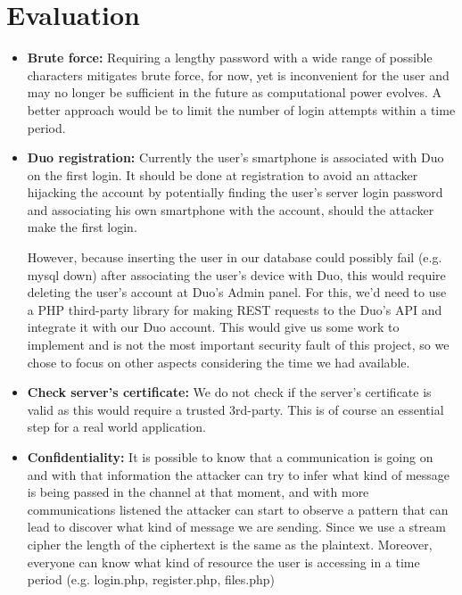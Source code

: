 \documentclass[12pt]{article}
\begin{document}
\section{Evaluation}
\begin{itemize}
    \item\textbf{Brute force:}
    Requiring a lengthy password with a wide range of possible characters mitigates brute force, for now, yet is inconvenient for the user and may no longer be sufficient in the future as computational power evolves. A better approach would be to limit the number of login attempts within a time period.

    \item \textbf{Duo registration:}
    Currently the user's smartphone is associated with Duo on the first login. It should be done at registration to avoid an attacker hijacking the account by potentially finding the user's server login password and associating his own smartphone with the account, should the attacker make the first login.

    However, because inserting the user in our database could possibly fail (e.g. mysql down) after associating the user's device with Duo, this would require deleting the user's account at Duo's Admin panel. For this, we'd need to use a PHP third-party library for making REST requests to the Duo's API and integrate it with our Duo account. This would give us some work to implement and is not the most important security fault of this project, so we chose to focus on other aspects considering the time we had available.

    \item \textbf{Check server's certificate:} We do not check if the server's certificate is valid as this would require a trusted 3rd-party. This is of course an essential step for a real world application.
    
    \item \textbf{Confidentiality:}
    It is possible to know that a communication is going on and with that information the attacker can try to infer what kind of message is being passed in the channel at that moment, and with more communications listened the attacker can start to observe a pattern that can lead to discover what kind of message we are sending. Since we use a stream cipher the length of the ciphertext is the same as the plaintext. Moreover, everyone can know what kind of resource the user is accessing in a time period (e.g. login.php, register.php, files.php)
    

\end{itemize}
\end{document}
